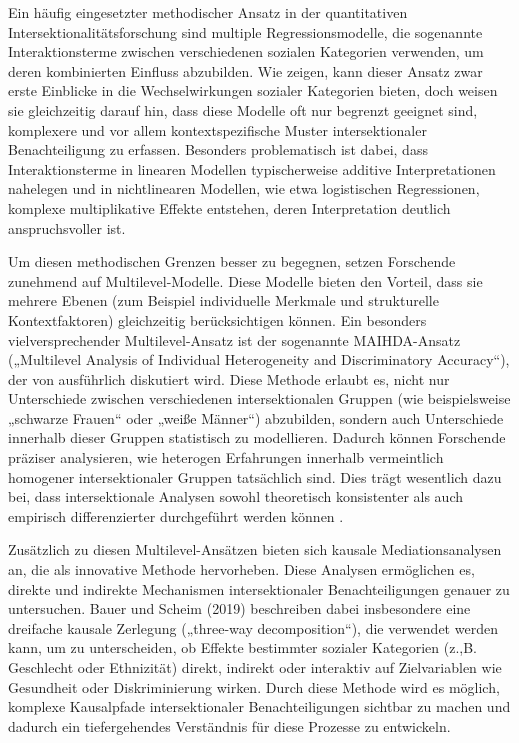 Ein häufig eingesetzter methodischer Ansatz in der quantitativen Intersektionalitätsforschung sind multiple Regressionsmodelle, die sogenannte Interaktionsterme zwischen verschiedenen sozialen Kategorien verwenden, um deren kombinierten Einfluss abzubilden. Wie \textcite{scottIntersectionalityQuantitativeMethods2017} zeigen, kann dieser Ansatz zwar erste Einblicke in die Wechselwirkungen sozialer Kategorien bieten, doch weisen sie gleichzeitig darauf hin, dass diese Modelle oft nur begrenzt geeignet sind, komplexere und vor allem kontextspezifische Muster intersektionaler Benachteiligung zu erfassen. Besonders problematisch ist dabei, dass Interaktionsterme in linearen Modellen typischerweise additive Interpretationen nahelegen und in nichtlinearen Modellen, wie etwa logistischen Regressionen, komplexe multiplikative Effekte entstehen, deren Interpretation deutlich anspruchsvoller ist.

Um diesen methodischen Grenzen besser zu begegnen, setzen Forschende zunehmend auf Multilevel-Modelle. Diese Modelle bieten den Vorteil, dass sie mehrere Ebenen (zum Beispiel individuelle Merkmale und strukturelle Kontextfaktoren) gleichzeitig berücksichtigen können. Ein besonders vielversprechender Multilevel-Ansatz ist der sogenannte MAIHDA-Ansatz („Multilevel Analysis of Individual Heterogeneity and Discriminatory Accuracy“), der von \textcite{grossModellingIntersectionalityQuantitative2023} ausführlich diskutiert wird. Diese Methode erlaubt es, nicht nur Unterschiede zwischen verschiedenen intersektionalen Gruppen (wie beispielsweise „schwarze Frauen“ oder „weiße Männer“) abzubilden, sondern auch Unterschiede innerhalb dieser Gruppen statistisch zu modellieren. Dadurch können Forschende präziser analysieren, wie heterogen Erfahrungen innerhalb vermeintlich homogener intersektionaler Gruppen tatsächlich sind. Dies trägt wesentlich dazu bei, dass intersektionale Analysen sowohl theoretisch konsistenter als auch empirisch differenzierter durchgeführt werden können \parencite{grossModellingIntersectionalityQuantitative2023}.

Zusätzlich zu diesen Multilevel-Ansätzen bieten sich kausale Mediationsanalysen an, die \textcite{bauerAdvancingQuantitativeIntersectionality2019} als innovative Methode hervorheben. Diese Analysen ermöglichen es, direkte und indirekte Mechanismen intersektionaler Benachteiligungen genauer zu untersuchen. Bauer und Scheim (2019) beschreiben dabei insbesondere eine dreifache kausale Zerlegung („three-way decomposition“), die verwendet werden kann, um zu unterscheiden, ob Effekte bestimmter sozialer Kategorien (z.,B. Geschlecht oder Ethnizität) direkt, indirekt oder interaktiv auf Zielvariablen wie Gesundheit oder Diskriminierung wirken. Durch diese Methode wird es möglich, komplexe Kausalpfade intersektionaler Benachteiligungen sichtbar zu machen und dadurch ein tiefergehendes Verständnis für diese Prozesse zu entwickeln.

